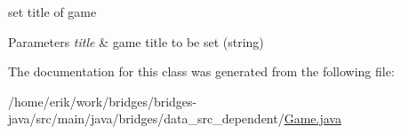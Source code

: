 set title of game 
\begin{DoxyParams}{Parameters}
{\em title} & game title to be set (string) \\
\hline
\end{DoxyParams}


The documentation for this class was generated from the following file\+:\begin{DoxyCompactItemize}
\item 
/home/erik/work/bridges/bridges-\/java/src/main/java/bridges/data\+\_\+src\+\_\+dependent/\hyperlink{_game_8java}{Game.\+java}\end{DoxyCompactItemize}
